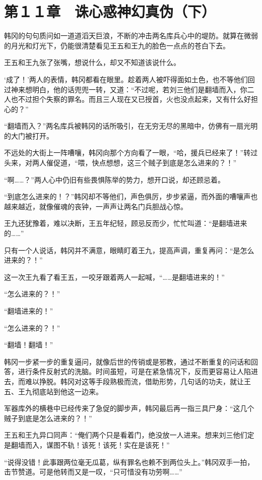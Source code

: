 \section{第１１章　诛心惑神幻真伪（下）}

韩冈的句句质问如一道道滔天巨浪，不断的冲击两名库兵心中的堤防。就算在微弱的月光和灯光下，仍能很清楚看见王五和王九的脸色一点点的苍白下去。

王五和王九张了张嘴，想说什么，却又不知道该说什么。

‘成了！’两人的表情，韩冈都看在眼里。趁着两人被吓得面如土色，也不等他们回过神来想明白，他的话兜兜一转，又道：“不过呢，若刘三他们是翻墙而入，你二人也不过担个失察的罪名。而且三人现在又已授首，火也没点起来，又有什么好担心的？”

“翻墙而入？”两名库兵被韩冈的话所吸引，在无穷无尽的黑暗中，仿佛有一扇光明的大门被打开。

不远处的大街上一阵嘈嚷，韩冈向那个方向看了一眼，“哈，援兵已经来了！”转过头来，对两人催促道，“喂，快点想想，这三个贼子到底是怎么进来的？！”

“啊……？”两人心中仍旧有些畏惧陈举的势力，想开口说，却还顾忌着。

“到底怎么进来的！？”韩冈却不等他们，声色俱厉，步步紧逼，而外面的嘈嚷声也越来越近，就像催魂的丧钟，一声声让两名门兵胆战心惊。

王九还犹豫着，难以决断，王五年纪轻，顾忌反而少，忙忙叫道：“是翻墙进来的……”

只有一个人说话，韩冈并不满意，眼睛盯着王九，提高声调，重复再问：“是怎么进来的？！”

这一次王九看了看王五，一咬牙跟着两人一起喊，“……是翻墙进来的！”

“怎么进来的？！”

“翻墙进来的！”

“怎么进来的？！”

“翻墙！翻墙！”

韩冈一步紧一步的重复逼问，就像后世的传销或是邪教，通过不断重复的问话和回答，进行条件反射式的洗脑。时间虽短，可是在紧急情况下，反而更容易让人陷进去，而难以挣脱。韩冈对这等手段熟极而流，借助形势，几句话的功夫，就让王五、王九彻底站到他这一边来。

军器库外的横巷中已经传来了急促的脚步声，韩冈最后再一指三具尸身：“这几个贼子到底是怎么进来的？！”

王五和王九异口同声：“俺们两个只是看着门，绝没放一人进来。想来刘三他们定是翻墙而入，谋图不轨！该死！该死！实在是该死！”

“说得没错！此事跟两位毫无瓜葛，纵有罪名也赖不到两位头上。”韩冈双手一拍，击节赞道。可是他转而又是一叹，“只可惜没有功劳啊……”

